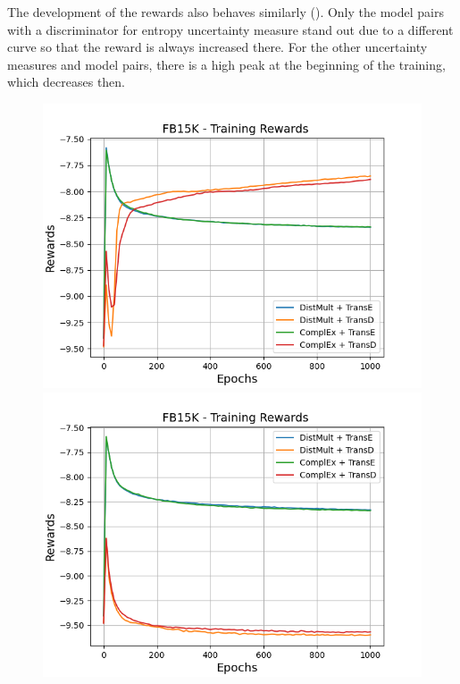 The development of the rewards also behaves similarly ().
Only the model pairs with a \transd discriminator for entropy uncertainty measure stand out due to a different curve so that the reward is always increased there.
For the other uncertainty measures and model pairs, there is a high peak at the beginning of the training, which decreases then.
\clearpage
\begin{figure}[H]
    \centering
    \begin{minipage}{.5\textwidth}
      \centering
      \includegraphics[width=0.9\linewidth]{figures/results/gan_train/not_pretrained/uncertainty/max_distribution/entropy/fb15k/1k_epochs/uncertainty_fb15k_rew.png}
    \end{minipage}%
    \begin{minipage}{.5\textwidth}
      \centering
      \includegraphics[width=0.9\linewidth]{figures/results/gan_train/not_pretrained/uncertainty/max_distribution/least_confidence/fb15k/uncertainty_fb15k_rew.png}

\end{minipage}
\end{figure}
